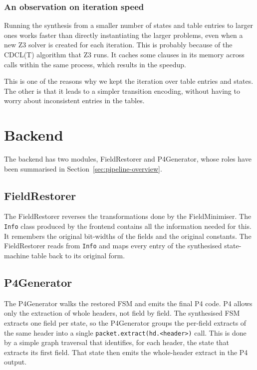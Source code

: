 \subsubsection*{An observation on iteration speed}

Running the synthesis from a smaller number of states and table
entries to larger ones works faster than directly instantiating the
larger problems, even when a new Z3 solver is created for each
iteration. This is probably because of the CDCL(T) algorithm that Z3
runs. It caches some clauses in its memory across calls within
the same process, which results in the speedup.

This is one of the reasons why we kept the iteration over table
entries and states. The other is that it leads to a simpler
transition encoding, without having to worry about inconsistent
entries in the tables.


\section{Backend}
\label{sec:backend}

The backend has two modules, FieldRestorer and P4Generator, whose
roles have been summarised in Section~\ref{sec:pipeline-overview}.

\subsection{FieldRestorer}

The FieldRestorer reverses the transformations done by the
FieldMinimiser. The \texttt{Info} class produced by the frontend
contains all the information needed for this. It remembers the
original bit-widths of the fields and the original
constants. The FieldRestorer reads from \texttt{Info} and maps
every entry of the synthesised state-machine table back to its
original form.

\subsection{P4Generator}

The P4Generator walks the restored FSM and emits the
final P4 code. P4 allows only the extraction of whole headers, not
field by field. The synthesised FSM extracts one field
per state, so the P4Generator groups the per-field extracts of the
same header into a single \texttt{packet.extract(hd.<header>)}
call. This is done by a simple graph traversal that identifies,
for each header, the state that extracts its first field. That
state then emits the whole-header extract in the P4 output.

